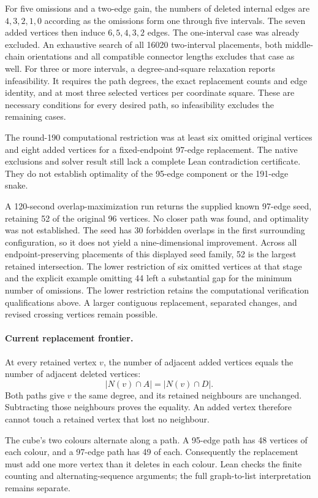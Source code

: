 \documentclass[11pt,a4paper]{article}
\begin{document}
For five omissions and a two-edge gain, the numbers of deleted internal
edges are $4,3,2,1,0$ according as the omissions form one through five
intervals. The seven added vertices then induce $6,5,4,3,2$ edges.
The one-interval case was already excluded. An exhaustive search of
all 16020 two-interval placements, both middle-chain orientations and
all compatible connector lengths excludes that case as well.
For three or more intervals, a degree-and-square relaxation reports
infeasibility. It requires the path degrees, the exact replacement
counts and edge identity, and at most three selected vertices per
coordinate square. These are necessary conditions for every desired
path, so infeasibility excludes the remaining cases.

The round-190 computational restriction was at least six omitted
original vertices and eight added vertices for a fixed-endpoint
97-edge replacement. The native exclusions and solver result still
lack a complete Lean contradiction certificate. They do not establish
optimality of the 95-edge component or the 191-edge snake.

A 120-second overlap-maximization run returns the supplied known
97-edge seed, retaining 52 of the original 96 vertices. No closer path
was found, and optimality was not established. The seed has 30 forbidden
overlaps in the first surrounding configuration, so it does not yield
a nine-dimensional improvement. Across all endpoint-preserving placements
of this displayed seed family, 52 is the largest retained intersection.
The lower restriction of six omitted vertices at that stage and the
explicit example omitting 44 left a substantial gap for the minimum
number of omissions. The lower restriction retains the computational
verification qualifications above. A larger contiguous replacement,
separated changes, and revised crossing vertices remain possible.



\paragraph{Current replacement frontier.}
At every retained vertex $v$, the number of adjacent added vertices
equals the number of adjacent deleted vertices:
\[
|N(v)\cap A|=|N(v)\cap D|.
\]
Both paths give $v$ the same degree, and its retained neighbours are
unchanged. Subtracting those neighbours proves the equality. An added
vertex therefore cannot touch a retained vertex that lost no neighbour.

The cube's two colours alternate along a path. A 95-edge path has
48 vertices of each colour, and a 97-edge path has 49 of each.
Consequently the replacement must add one more vertex than it deletes
in each colour. Lean checks the finite counting and alternating-sequence
arguments; the full graph-to-list interpretation remains separate.
\end{document}

